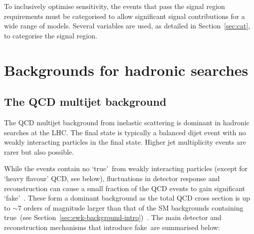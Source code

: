 To inclusively optimise sensitivity, the events that pass the signal region requirements 
must be categorised to allow significant signal contributions for a wide range of models. 
Several variables are used, as detailed in Section~\ref{sec:cat}, to categorise the signal region. 

\section{Backgrounds for hadronic searches}
\subsection{The QCD multijet background}
\label{sec:qcd-background-intro}
The QCD multijet background from inelastic scattering is dominant in hadronic searches at the LHC. 
The final state is typically a balanced dijet event with no weakly interacting particles 
in the final state. Higher jet multiplicity events are rarer but also possible.

While the events contain no `true'~\met from weakly interacting particles (except 
for `heavy flavour' QCD, see below),
fluctuations in detector response and reconstruction can cause a small fraction 
of the QCD events to gain significant `fake'~\met. These form a dominant background as 
the total QCD cross section is up to $\sim7$ orders of magnitude larger 
than that of the SM backgrounds containing true~\met (see Section~\ref{sec:ewk-background-intro})~\cite{inelast}.
The main detector and reconstruction mechanisms that introduce fake~\met are summarised below:

